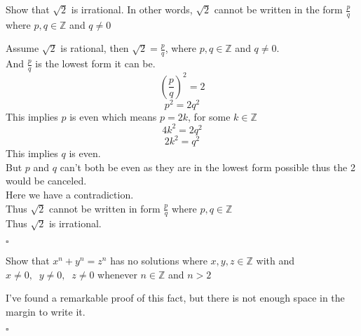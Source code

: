 \documentclass{exam}
\begin{document}
\begin{questions}
    \question Show that $\sqrt{2}$ is irrational. In other words, $\sqrt{2}$ cannot be written in the form $\frac{p}{q}$ where $p,q \in \mathbb{Z}$ and $q \neq 0$
    \begin{solution}
        Assume $\sqrt{2}$ is rational, then $\sqrt{2} = \frac{p}{q}$, where $p,q \in \mathbb{Z}$ and $q \neq 0$.
        \\And $\frac{p}{q}$ is the lowest form it can be. 
        $$\left(\frac{p}{q}\right)^2 = 2$$
        $$p^2 = 2 q^2$$
        This implies $p$ is even which means $p = 2k$, for some $k \in \mathbb{Z}$
        $$4k^2 = 2 q^2$$
        $$2k^2 = q^2$$
        This implies $q$ is even.
        \\But $p$ and $q$ can't both be even as they are in the lowest form possible thus the 2 would be canceled. 
        \\Here we have a contradiction.
        \\Thus $\sqrt{2}$ cannot be written in form $\frac{p}{q}$ where $p,q \in \mathbb{Z}$
        \\Thus $\sqrt{2}$ is irrational.
        \begin{flushright}
            $\square$
        \end{flushright}
    \end{solution}

    

    \question Show that $x^n + y^n = z^n$ has no solutions where $x, y,z \in \mathbb{Z}$ with and $x \neq 0, \;\; y \neq 0,\;\;z \neq 0$ whenever $n\in \mathbb{Z}$ and $n > 2$
    \begin{solution}
        I've found a remarkable proof of this fact, but there is not enough space in the margin to write it. 
        \begin{flushright}
            $\square$
        \end{flushright}
    \end{solution}


    
\end{questions}
\end{document}
